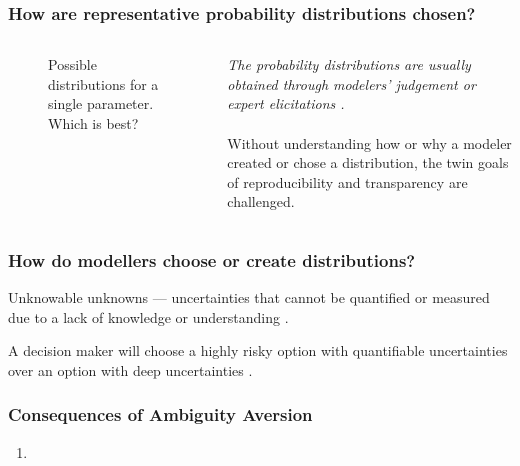 \begin{frame}
    \frametitle{How are representative probability distributions chosen?}

    \begin{columns}
        \column[t]{5cm}
        \begin{figure}
            \centering
            \resizebox{\columnwidth}{!}{
                
            }
            \caption{Possible distributions for a single parameter. Which is best?}
            \label{fig:many-distributions}
        \end{figure}
        \column[t]{5cm}
            \textit{The probability distributions are usually obtained through modelers'
            judgement or expert elicitations \cite{yue_review_2018}.}\\~\\

             Without understanding how or why a modeler created or 
            chose a distribution, the twin goals of reproducibility and transparency are
            challenged.
    \end{columns}

\end{frame}

\begin{frame}
    \frametitle{How do modellers choose or create distributions?}
        \begin{definition}
            Unknowable unknowns --- uncertainties that cannot be quantified or measured due to a 
            lack of knowledge or understanding \cite{knight_risk_1921}. 
        \end{definition}

        \begin{definition}
            A decision maker will choose a highly risky option with quantifiable uncertainties
            over an option with deep uncertainties \cite{ellsberg_risk_1961}.
        \end{definition}
\end{frame}


\begin{frame}
    \frametitle{Consequences of Ambiguity Aversion}

    \begin{enumerate}
        \item 
    \end{enumerate}

\end{frame}
